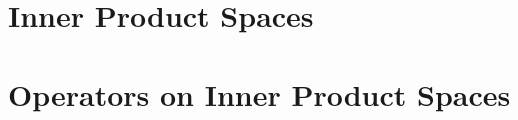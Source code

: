 \documentclass[10pt]{report}
\begin{document}
  \chapter{Inner Product Spaces}
  
  
  

  \chapter{Operators on Inner Product Spaces}
  
  
  
  
  
  
\end{document}
